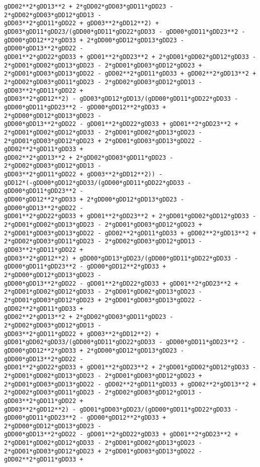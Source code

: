 \documentclass[landscape,letterpaper,10pt,english]{article}
\begin{document}
\begin{Verbatim}[commandchars=\\\{\}]
gDD02**2*gDD13**2 + 2*gDD02*gDD03*gDD11*gDD23 - 2*gDD02*gDD03*gDD12*gDD13 -
gDD03**2*gDD11*gDD22 + gDD03**2*gDD12**2) +
gDD03*gDD11*gDD23/(gDD00*gDD11*gDD22*gDD33 - gDD00*gDD11*gDD23**2 -
gDD00*gDD12**2*gDD33 + 2*gDD00*gDD12*gDD13*gDD23 - gDD00*gDD13**2*gDD22 -
gDD01**2*gDD22*gDD33 + gDD01**2*gDD23**2 + 2*gDD01*gDD02*gDD12*gDD33 -
2*gDD01*gDD02*gDD13*gDD23 - 2*gDD01*gDD03*gDD12*gDD23 +
2*gDD01*gDD03*gDD13*gDD22 - gDD02**2*gDD11*gDD33 + gDD02**2*gDD13**2 +
2*gDD02*gDD03*gDD11*gDD23 - 2*gDD02*gDD03*gDD12*gDD13 - gDD03**2*gDD11*gDD22 +
gDD03**2*gDD12**2) - gDD03*gDD12*gDD13/(gDD00*gDD11*gDD22*gDD33 -
gDD00*gDD11*gDD23**2 - gDD00*gDD12**2*gDD33 + 2*gDD00*gDD12*gDD13*gDD23 -
gDD00*gDD13**2*gDD22 - gDD01**2*gDD22*gDD33 + gDD01**2*gDD23**2 +
2*gDD01*gDD02*gDD12*gDD33 - 2*gDD01*gDD02*gDD13*gDD23 -
2*gDD01*gDD03*gDD12*gDD23 + 2*gDD01*gDD03*gDD13*gDD22 - gDD02**2*gDD11*gDD33 +
gDD02**2*gDD13**2 + 2*gDD02*gDD03*gDD11*gDD23 - 2*gDD02*gDD03*gDD12*gDD13 -
gDD03**2*gDD11*gDD22 + gDD03**2*gDD12**2)) -
gDD12*(-gDD00*gDD12*gDD33/(gDD00*gDD11*gDD22*gDD33 - gDD00*gDD11*gDD23**2 -
gDD00*gDD12**2*gDD33 + 2*gDD00*gDD12*gDD13*gDD23 - gDD00*gDD13**2*gDD22 -
gDD01**2*gDD22*gDD33 + gDD01**2*gDD23**2 + 2*gDD01*gDD02*gDD12*gDD33 -
2*gDD01*gDD02*gDD13*gDD23 - 2*gDD01*gDD03*gDD12*gDD23 +
2*gDD01*gDD03*gDD13*gDD22 - gDD02**2*gDD11*gDD33 + gDD02**2*gDD13**2 +
2*gDD02*gDD03*gDD11*gDD23 - 2*gDD02*gDD03*gDD12*gDD13 - gDD03**2*gDD11*gDD22 +
gDD03**2*gDD12**2) + gDD00*gDD13*gDD23/(gDD00*gDD11*gDD22*gDD33 -
gDD00*gDD11*gDD23**2 - gDD00*gDD12**2*gDD33 + 2*gDD00*gDD12*gDD13*gDD23 -
gDD00*gDD13**2*gDD22 - gDD01**2*gDD22*gDD33 + gDD01**2*gDD23**2 +
2*gDD01*gDD02*gDD12*gDD33 - 2*gDD01*gDD02*gDD13*gDD23 -
2*gDD01*gDD03*gDD12*gDD23 + 2*gDD01*gDD03*gDD13*gDD22 - gDD02**2*gDD11*gDD33 +
gDD02**2*gDD13**2 + 2*gDD02*gDD03*gDD11*gDD23 - 2*gDD02*gDD03*gDD12*gDD13 -
gDD03**2*gDD11*gDD22 + gDD03**2*gDD12**2) +
gDD01*gDD02*gDD33/(gDD00*gDD11*gDD22*gDD33 - gDD00*gDD11*gDD23**2 -
gDD00*gDD12**2*gDD33 + 2*gDD00*gDD12*gDD13*gDD23 - gDD00*gDD13**2*gDD22 -
gDD01**2*gDD22*gDD33 + gDD01**2*gDD23**2 + 2*gDD01*gDD02*gDD12*gDD33 -
2*gDD01*gDD02*gDD13*gDD23 - 2*gDD01*gDD03*gDD12*gDD23 +
2*gDD01*gDD03*gDD13*gDD22 - gDD02**2*gDD11*gDD33 + gDD02**2*gDD13**2 +
2*gDD02*gDD03*gDD11*gDD23 - 2*gDD02*gDD03*gDD12*gDD13 - gDD03**2*gDD11*gDD22 +
gDD03**2*gDD12**2) - gDD01*gDD03*gDD23/(gDD00*gDD11*gDD22*gDD33 -
gDD00*gDD11*gDD23**2 - gDD00*gDD12**2*gDD33 + 2*gDD00*gDD12*gDD13*gDD23 -
gDD00*gDD13**2*gDD22 - gDD01**2*gDD22*gDD33 + gDD01**2*gDD23**2 +
2*gDD01*gDD02*gDD12*gDD33 - 2*gDD01*gDD02*gDD13*gDD23 -
2*gDD01*gDD03*gDD12*gDD23 + 2*gDD01*gDD03*gDD13*gDD22 - gDD02**2*gDD11*gDD33 +

\end{Verbatim}
\end{document}
